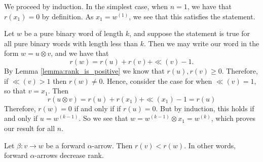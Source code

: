 \begin{prf}
    We proceed by induction. In the simplest
    case, when $n = 1$, we have that
    $r(x_1) = 0$ by definition. As $x_1 = w^{(1)}$, we 
    see that this satisfies the statement.

    Let $w$ be a pure binary word of length $k$, and suppose 
    the statement is true for all pure binary words with length 
    less than $k$.
    Then we may write our word in the form $w = u \otimes v$, 
    and we have that
    \[
        r(w) = r(u) + r(v) + \ll(v) - 1.        
    \]
    By Lemma \ref{lemma:rank_is_positive}  we know that 
    $r(u), r(v) \ge 0$. Therefore, if $\ll(v) >  1$ then 
    $r(w) \ne 0$. 
    Hence, consider the case 
    for when $\ll(v) = 1$, so that $v = x_1$. Then 
    \[
        r(u\otimes v) = r(u) + r(x_1) + \ll(x_1) - 1 = r(u)
    \] 
    Therefore, $r(w) = 0$ if and only if
    if $r(u) = 0$. But by induction, this holds if and only if $u = w^{(k-1)}$. 
    So we see that $w = w^{(k-1)}\otimes x_1 = w^{(k)}$, which proves our result for all $n$.
\end{prf}

\begin{lemma}\label{lemma:directed_decreases_rank}
    Let $\beta: v \to w$ be a forward $\alpha$-arrow. 
    Then $r(v) < r(w)$. In other words, forward $\alpha$-arrows decrease rank. 
\end{lemma}

